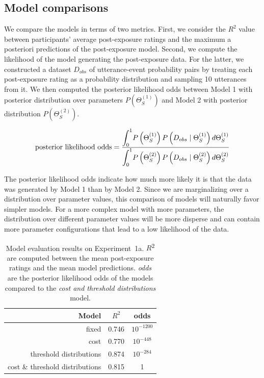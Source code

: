 \documentclass[lucida,biblatex]{sp} %
\begin{document}
\subsection{Model comparisons}

We compare the models in terms of two metrics. First, we consider the $R^2$ value between participants' average post-exposure ratings and the maximum a posteriori predictions of the post-exposure model. Second, we compute the likelihood of the model generating the post-exposure data. For the latter, we constructed a dataset $D_{obs}$ of utterance-event probability pairs by treating each post-exposure rating as a probability distribution and sampling 10 utterances from it. We then computed the posterior likelihood odds between Model 1 with posterior distribution over parameters $P(\Theta_{S}^{(1)})$ and Model 2 with posterior distribution $P(\Theta_{S}^{(2)})$.

$$\mbox{posterior likelihood odds} = \frac{\mathlarger{\int_0^1} {P\left(\Theta_{S}^{(1)}\right) P\left(D_{obs} \mid \Theta_{S}^{(1)} \right) d   \Theta_{S}^{(1)}}}{\mathlarger{\int_0^1} P\left(\Theta_{S}^{(2)}\right) P\left(D_{obs} \mid \Theta_{S}^{(2)}\right)d   \Theta_{S}^{(2)} }$$
 
\noindent The posterior likelihood odds indicate how much more likely it is that the data was generated by Model 1 than by Model 2. Since we are marginalizing over a distribution over parameter values, this comparison of models will naturally
favor simpler models. For a more complex model with more parameters, the distribution over different parameter values will be more disperse and can contain more parameter configurations that lead to a low likelihood of the data.

\begin{table}
\center
\begin{tabular}{r | c | c  }
Model & $R^2$ &   odds  \\ \midrule
fixed & 0.746 & $10^{-1200}$    \\
cost & 0.770 &  $10^{-448}$    \\
threshold distributions & 0.874 &  $10^{-284}$   \\
cost \& threshold distributions & 0.815 & 1 \\
\end{tabular}
\caption{Model evaluation results on Experiment~1a. $R$\textsuperscript{$2$} are computed between  the mean post-exposure ratings and the mean model predictions. \textit{odds} are the posterior likelihood odds of the models compared to the \textit{cost and threshold distributions} model. \label{tbl:model-comparison}}
\end{table}
\end{document}
